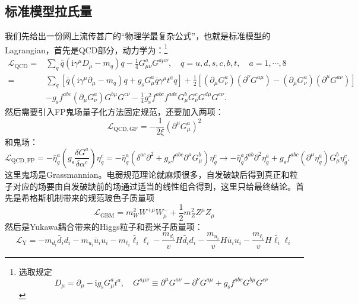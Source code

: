 \subsection{标准模型拉氏量}
我们先给出一份网上流传甚广的“物理学最复杂公式”，也就是标准模型的Lagrangian，首先是QCD部分，动力学为：\footnote{选取规定\[D_\mu=\partial_\mu-\mathrm{i}g_\mathrm{s}G_\mu^at^a,\quad G^{a\mu\nu}\equiv\partial^\mu G^{a\nu}-\partial^\nu G^{a\mu}+g_\mathrm{s}f^{abc}G^{b\mu}G^{c\nu}\]}
\begin{equation}
	\begin{aligned}
		\mathcal{L}_\mathrm{QCD}=&\sum_q\bar{q}(\mathrm{i}\gamma^\mu D_\mu-m_q)q-\frac14G_{\mu\nu}^aG^{a\mu\nu},\quad q=u,d,s,c,b,t,\quad a=1,\cdots,8\\
		=&\sum_q[\bar{q}(\mathrm{i}\gamma^{\mu}\partial_{\mu}-m_{q})q+g_{\mathrm{s}}G_{\mu}^{a}\bar{q}\gamma^{\mu}t^{a}q]+\frac12[(\partial_{\mu}G_{\nu}^{a})(\partial^{\nu}G^{a\mu})-(\partial_{\mu}G_{\nu}^{a})(\partial^{\mu}G^{a\nu})]\\
		&-g_{\mathrm{s}}f^{abc}(\partial_{\mu}G_{\nu}^{a})G^{b\mu}G^{c\nu}-\frac{1}{4}g_{\mathrm{s}}^{2}f^{abc}f^{ade}G_{\mu}^{b}G_{\nu}^{c}G^{d\mu}G^{e\nu}.
	\end{aligned}
\end{equation}
然后需要引入FP鬼场量子化方法固定规范，还要加入两项：
\begin{equation}
	\mathcal{L}_{\mathrm{QCD,GF}}=-\frac1{2\xi}(\partial^{\mu}G_{\mu}^{a})^{2}
\end{equation}
和鬼场：
\begin{equation}
	\mathcal{L}_{\mathrm{QCD,FP}}=-\bar{\eta}_{g}^{a}\left(g_{\mathrm{s}}\frac{\delta G^{a}}{\delta\alpha^{c}}\right)\eta_{g}^{c}=-\bar{\eta}_{g}^{a}(\delta^{ac}\partial^{2}+g_{\mathrm{s}}f^{abc}\partial^{\mu}G_{\mu}^{b})\eta_{g}^{c}\rightarrow-\bar{\eta}_{g}^{a}\delta^{ab}\partial^{2}\eta_{g}^{a}+g_{\mathrm{s}}f^{abc}(\partial^{\mu}\eta_{g}^{a})G_{\mu}^{b}\eta_{g}^{c}.
\end{equation}
这里鬼场是Grassmannian。电弱规范理论就麻烦很多，自发破缺后得到真正和粒子对应的场要由自发破缺前的场通过适当的线性组合得到，这里只给最终结论。首先是希格斯机制带来的规范玻色子质量项
\begin{equation}
	\mathcal{L}_\mathrm{GBM}=m_W^2W^{+\mu}W_\mu^-+\frac12m_Z^2Z^\mu Z_\mu 
\end{equation}
然后是Yukawa耦合带来的Higgs粒子和费米子质量项：
\begin{equation}
	\mathcal{L}_{\mathrm{Y}}=-m_{d_i}\bar{d}_id_i-m_{u_i}\bar{u}_iu_i-m_{\ell_i}\bar{\ell}_i\ell_i-\frac{m_{d_i}}vH\bar{d}_id_i-\frac{m_{u_i}}vH\bar{u}_iu_i-\frac{m_{\ell_i}}vH\bar{\ell}_i\ell_i
\end{equation}
